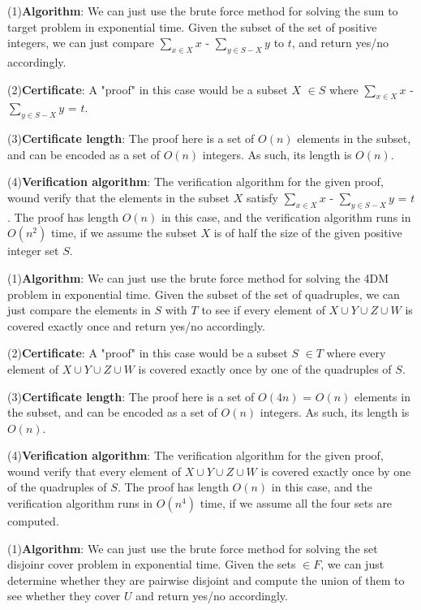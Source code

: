 \documentclass[12pt,a4paper]{article}
\newcommand{\question}[1]{\bigskip\noindent{\textbf{Q{#1} solution}}}
\begin{document}
\question{31.C}

(1)\textbf{Algorithm}: We can just use the brute force method for solving the sum to target problem in exponential time.
Given the subset of the set of positive integers, we can just compare ${\sum_{x\in X}x}$ - ${\sum_{y\in S-X} y}$ to $t$, and return yes/no accordingly.

(2)\textbf{Certificate}: A "proof" in this case would be a subset $X$ $\in S$ where ${\sum_{x\in X}x}$ - ${\sum_{y\in S-X} y}$ = $t$.

(3)\textbf{Certificate length}: The proof here is a set of $O(n)$ elements in the subset, and can be encoded as a set of $O(n)$ integers. As such, its length is $O(n)$.

(4)\textbf{Verification algorithm}: The verification algorithm for the given proof, wound verify that the elements in the subset $X$ satisfy ${\sum_{x\in X}x}$ - ${\sum_{y\in S-X} y}$ = $t$.
The proof has length $O(n)$ in this case, and the verification algorithm runs in $O(n^2)$ time, if we assume the subset $X$ is of half the size of the given positive integer set $S$.

\question{31.D}

(1)\textbf{Algorithm}: We can just use the brute force method for solving the 4DM problem in exponential time.
Given the subset of the set of quadruples, we can just compare the elements in $S$ with $T$ to see if every element of $X\cup Y\cup Z\cup W$ is covered exactly once and return yes/no accordingly.

(2)\textbf{Certificate}: A "proof" in this case would be a subset $S$ $\in T$ where every element of $X\cup Y\cup Z\cup W$ is covered exactly once by one of the quadruples of $S$.

(3)\textbf{Certificate length}: The proof here is a set of $O(4n)$ = $O(n)$ elements in the subset, and can be encoded as a set of $O(n)$ integers. As such, its length is $O(n)$.

(4)\textbf{Verification algorithm}: The verification algorithm for the given proof, wound verify that every element of $X\cup Y\cup Z\cup W$ is covered exactly once by one of the quadruples of $S$.
The proof has length $O(n)$ in this case, and the verification algorithm runs in $O(n^4)$ time, if we assume all the four sets are computed.

\question{31.E}

(1)\textbf{Algorithm}: We can just use the brute force method for solving the set disjoinr cover problem in exponential time.
Given the sets $\in F$, we can just determine whether they are pairwise disjoint and compute the union of them to see whether they cover $U$ and return yes/no accordingly.
\end{document}
